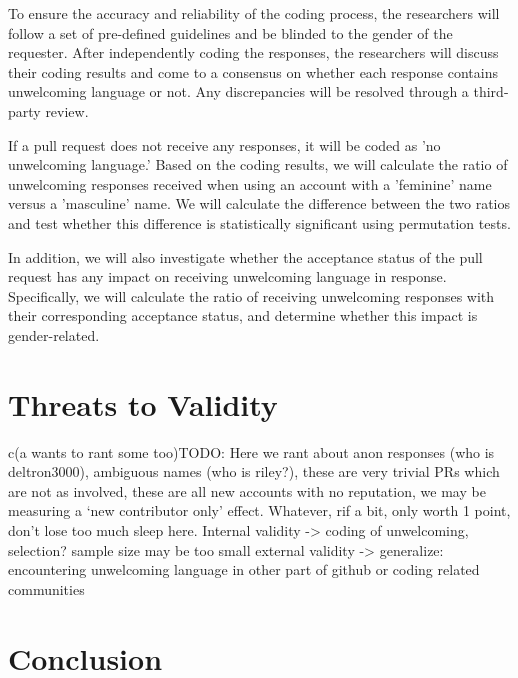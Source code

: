 \documentclass[journal,12pt,onecolumn,]{IEEEtran}
\begin{document}
To ensure the accuracy and reliability of the coding process, the researchers will follow a set of pre-defined guidelines and be blinded to the gender of the requester. After independently coding the responses, the researchers will discuss their coding results and come to a consensus on whether each response contains unwelcoming language or not. Any discrepancies will be resolved through a third-party review.

If a pull request does not receive any responses, it will be coded as 'no unwelcoming language.' Based on the coding results, we will calculate the ratio of unwelcoming responses received when using an account with a 'feminine' name versus a 'masculine' name. We will calculate the difference between the two ratios and test whether this difference is statistically significant using permutation tests.

In addition, we will also investigate whether the acceptance status of the pull request has any impact on receiving unwelcoming language in response. Specifically, we will calculate the ratio of receiving unwelcoming responses with their corresponding acceptance status, and determine whether this impact is gender-related.


\section{Threats to Validity}

c(a wants to rant some too)TODO: Here we rant about anon responses (who is deltron3000), ambiguous names (who is riley?), these are very trivial PRs which are not as involved, these are all new accounts with no reputation, we may be measuring a `new contributor only' effect.  Whatever, rif a bit, only worth 1 point, don't lose too much sleep here.
Internal validity -> coding of unwelcoming, selection? sample size may be too small
external validity -> generalize: encountering unwelcoming language in other part of github or coding related communities
\section{Conclusion}
%



\end{document}
